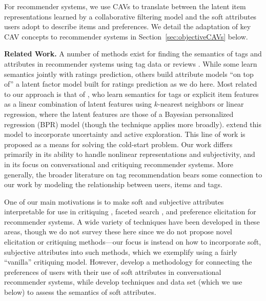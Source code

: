 \documentclass[manuscript,screen,nonacm]{acmart}
\newcommand{\1}{{\mathbf 1}}
\theoremstyle{TheoremNum}
\begin{document}
For recommender systems, we use CAVs to translate between the latent item representations learned by a collaborative filtering model and the soft attributes users adopt to describe items and preferences. We detail the adaptation of key CAV concepts to recommender systems in Section~\ref{sec:objectiveCAVs} below.


\vskip 2mm
\noindent
\textbf{Related Work.} \hspace*{2mm}
A number of methods exist for finding the semantics of tags and attributes in recommender systems using tag data \cite{gantner:icdm2010,luo2020latent} or reviews \cite{mcauley:icdm2012}. While some learn semantics jointly with ratings prediction, others build attribute models ``on top of'' a latent factor model built for ratings prediction as we do here. Most related to our approach is that of \citet{gantner:icdm2010}, who learn semantics for tags or explicit item features as a linear combination of latent features using $k$-nearest neighbors or linear regression, where the latent features are those of a Bayesian personalized regression (BPR) model \cite{rendle_BPR:uai09} (though the technique applies more broadly). \citet{cohen:recsys2017} extend this model to incorporate uncertainty and active exploration. This line of work is proposed as a means for solving the cold-start problem. Our work differs primarily in its ability to handle nonlinear representations and subjectivity, and in its focus on conversational and critiquing recommender systems. More generally, the broader literature on tag recommendation bears some connection to our work \cite{krestel:recsys09,rendle2010,krohn-grimberghe:wsdm12,marinho:ecml09} by modeling the relationship between users, items and tags.
 
 
 One of our main motivations is to make soft and subjective attributes interpretable for use in critiquing \cite{chen_critiquing_survey:umuai2012}, faceted search \cite{zheng_faceted_survey:2013}, and preference elicitation \cite{cf-survey:2005,viappiani:06,priyogi19} for recommender systems. A wide variety of techniques have been developed in these areas, though we do not survey these here since we do not propose novel elicitation or critiquing methods---our focus is instead on how to incorporate soft, subjective attributes into such methods, which we exemplify using a fairly ``vanilla'' critiquing model. However, \citet{radlinski:sdd2019} develop a methodology for connecting the preferences of users with their use of soft attributes in conversational recommender systems, while \citet{sigir21:filipandkristian} develop techniques and data set (which we use below) to assess the semantics of soft attributes.
 
\end{document}
